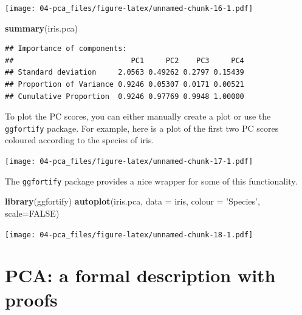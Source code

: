 \documentclass[]{book}
\newenvironment{Shaded}{\begin{snugshade}}{\end{snugshade}}
\newcommand{\DataTypeTok}[1]{\textcolor[rgb]{0.13,0.29,0.53}{#1}}
\newcommand{\DecValTok}[1]{\textcolor[rgb]{0.00,0.00,0.81}{#1}}
\newcommand{\KeywordTok}[1]{\textcolor[rgb]{0.13,0.29,0.53}{\textbf{#1}}}
\newcommand{\NormalTok}[1]{#1}
\newcommand{\OperatorTok}[1]{\textcolor[rgb]{0.81,0.36,0.00}{\textbf{#1}}}
\newcommand{\OtherTok}[1]{\textcolor[rgb]{0.56,0.35,0.01}{#1}}
\newcommand{\StringTok}[1]{\textcolor[rgb]{0.31,0.60,0.02}{#1}}
\theoremstyle{definition}
\theoremstyle{definition}
\theoremstyle{definition}
\theoremstyle{remark}
\begin{document}
\texttt{[image: 04-pca\_files/figure-latex/unnamed-chunk-16-1.pdf]}

\begin{Shaded}
\begin{Highlighting}[]
\KeywordTok{summary}\NormalTok{(iris.pca)}
\end{Highlighting}
\end{Shaded}

\begin{verbatim}
## Importance of components:
##                           PC1     PC2    PC3     PC4
## Standard deviation     2.0563 0.49262 0.2797 0.15439
## Proportion of Variance 0.9246 0.05307 0.0171 0.00521
## Cumulative Proportion  0.9246 0.97769 0.9948 1.00000
\end{verbatim}

To plot the PC scores, you can either manually create a plot or use the \texttt{ggfortify} package. For example, here is a plot of the first two PC scores coloured according to the species of iris.

\begin{Shaded}
\end{Shaded}

\texttt{[image: 04-pca\_files/figure-latex/unnamed-chunk-17-1.pdf]}

The \texttt{ggfortify} package provides a nice wrapper for some of this functionality.

\begin{Shaded}
\begin{Highlighting}[]
\KeywordTok{library}\NormalTok{(ggfortify)}
\KeywordTok{autoplot}\NormalTok{(iris.pca, }\DataTypeTok{data =}\NormalTok{ iris, }\DataTypeTok{colour =} \StringTok{'Species'}\NormalTok{, }\DataTypeTok{scale=}\OtherTok{FALSE}\NormalTok{)}
\end{Highlighting}
\end{Shaded}

\texttt{[image: 04-pca\_files/figure-latex/unnamed-chunk-18-1.pdf]}

\hypertarget{pca-a-formal-description-with-proofs}{%
\section{PCA: a formal description with proofs}\label{pca-a-formal-description-with-proofs}}
\end{document}
